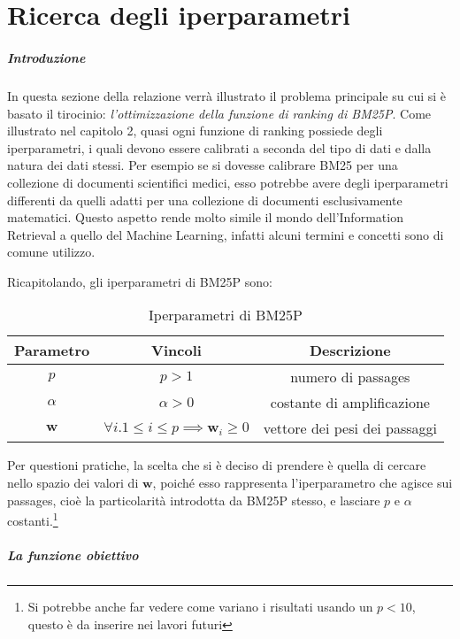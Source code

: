 \chapter{Ricerca degli iperparametri}

\paragraph{Introduzione}
In questa sezione della relazione verrà illustrato il problema principale su cui si è basato il tirocinio:
\textit{l'ottimizzazione della funzione di ranking di BM25P}.
Come illustrato nel capitolo 2, quasi ogni funzione di ranking possiede degli iperparametri, i quali
devono essere calibrati a seconda del tipo di dati e dalla natura dei dati stessi.
Per esempio se si dovesse calibrare BM25 per una collezione
di documenti scientifici medici, esso potrebbe avere degli iperparametri
differenti da quelli adatti per una collezione di documenti esclusivamente matematici.
Questo aspetto rende molto simile il mondo dell'Information Retrieval a quello del Machine Learning,
infatti alcuni termini e concetti sono di comune utilizzo.


Ricapitolando, gli iperparametri di BM25P sono:
\begin{table}[h!]
	\centering
	\begin{tabular}{|c|c|c|}
		\hline
		Parametro & Vincoli & Descrizione \\
		\hline
		$p$ & $p>1$ & numero di passages \\
		\hline
		$\alpha$ & $\alpha > 0$ & costante di amplificazione \\
		\hline
		$\boldsymbol{w}$ & $\forall{i.1 \leq i \leq p}\implies \boldsymbol{w}_i \geq 0$ & vettore dei pesi dei passaggi \\
		\hline
	\end{tabular}
\caption{Iperparametri di BM25P}
\end{table}

Per questioni pratiche, la scelta che si è deciso di prendere è quella di cercare
nello spazio dei valori di $\boldsymbol{w}$, poiché esso rappresenta l'iperparametro
che agisce sui passages, cioè la particolarità introdotta da BM25P stesso, e lasciare
$p$ e $\alpha$ costanti.\footnote{Si potrebbe anche far vedere come variano i risultati usando un $p<10$, questo è da inserire nei lavori futuri}

\paragraph{La funzione obiettivo}

